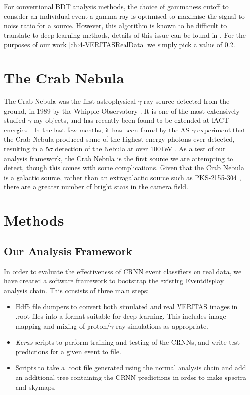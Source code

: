 For conventional BDT analysis methods, the choice of gammaness cutoff to consider an individual event a gamma-ray is optimised to maximise the signal to noise ratio for a source. However, this algorithm is known to be difficult to translate to deep learning methods, details of this issue can be found in \cite{Shilon}. For the purposes of our work \ref{ch:4-VERITASRealData} we simply pick a value of 0.2.

\section{The Crab Nebula}
The Crab Nebula was the first astrophysical $\gamma$-ray source detected from the ground, in 1989 by the Whipple Observatory \cite{weekestev}. It is one of the most extensively studied $\gamma$-ray objects, and has recently been found to be extended at IACT energies \cite{holler}. In the last few months, it has been found by the AS-$\gamma$ experiment that the Crab Nebula produced some of the highest energy photons ever detected, resulting in a 5$\sigma$ detection of the Nebula at over 100TeV \cite{asgamma}. As a test of our analysis framework, the Crab Nebula is the first source we are attempting to detect, though this comes with some complications. Given that the Crab Nebula is a galactic source, rather than an extragalactic source such as PKS-2155-304 \cite{Shilon}, there are a greater number of bright stars in the camera field.

\section{Methods}
\subsection{Our Analysis Framework}
In order to evaluate the effectiveness of CRNN event classifiers on real data, we have created a software framework to bootstrap the existing Eventdisplay analysis chain. This consists of three main steps:

\begin{itemize}
    \item Hdf5 file dumpers to convert both simulated and real VERITAS images in .root files into a format suitable for deep learning. This includes image mapping and mixing of proton/$\gamma$-ray simulations as appropriate.
    \item \textit{Keras} scripts to perform training and testing of the CRNNs, and write test predictions for a given event to file.
    \item Scripts to take a .root file generated using the normal analysis chain and add an additional tree containing the CRNN predictions in order to make spectra and skymaps.
\end{itemize}

